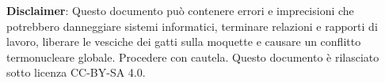 \documentclass[a4paper, 11pt]{exam}
\begin{document}
\textbf{Disclaimer}:  Questo documento può contenere errori e imprecisioni che potrebbero danneggiare sistemi informatici, terminare relazioni e rapporti di lavoro, liberare le vesciche dei gatti sulla moquette e causare un conflitto termonucleare globale.
Procedere con cautela.
Questo documento è rilasciato sotto licenza CC-BY-SA 4.0. \ccbysa
\end{document}
